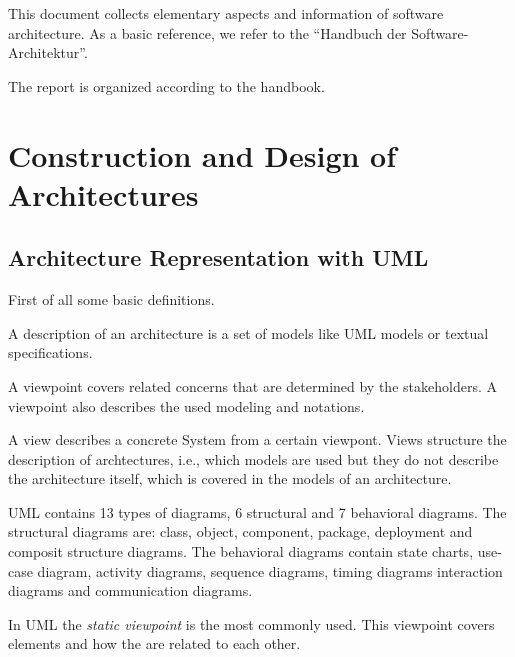 This document collects elementary aspects and information of software architecture.
As a basic reference, we refer to the ``Handbuch der Software-Architektur''.

The report is organized according to the handbook. 

\section{Construction and Design of Architectures}
\label{sec:construction}

\subsection{Architecture Representation with UML}

First of all some basic definitions.

\begin{definition}
A description of an architecture is a set of models like UML models or textual specifications.
\end{definition}


\begin{definition}[Viewpoint]
A viewpoint covers related concerns that are determined by the stakeholders.
A viewpoint also describes the used modeling and notations.
\end{definition}

\begin{definition}[View]
A view describes a concrete System from a certain viewpont.
Views structure the description of archtectures, i.e., which
models are used but they do not describe the architecture itself,
which is covered in the models of an architecture.
\end{definition}


UML contains 13 types of diagrams, 6 structural and 7 behavioral diagrams.
The structural diagrams are: class, object, component, package, deployment and 
composit structure diagrams.
The behavioral diagrams contain state charts, use-case diagram,
activity diagrams, sequence diagrams, timing diagrams interaction diagrams and communication diagrams.

In UML the \emph{static viewpoint} is the most commonly used. This viewpoint covers elements and how
the are related to each other. 


